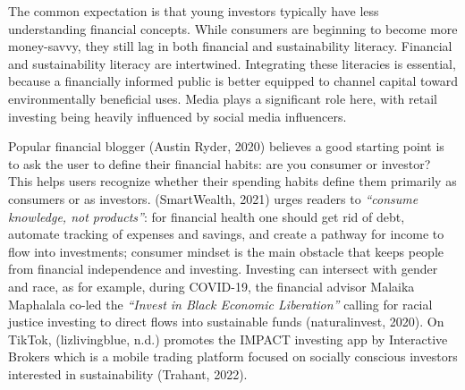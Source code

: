 \documentclass[
  12pt,
  letterpaper,
  DIV=11,
  numbers=noendperiod]{scrartcl}
\begin{document}
The common expectation is that young investors typically have less
understanding financial concepts. While consumers are beginning to
become more money-savvy, they still lag in both financial and
sustainability literacy. Financial and sustainability literacy are
intertwined. Integrating these literacies is essential, because a
financially informed public is better equipped to channel capital toward
environmentally beneficial uses. Media plays a significant role here,
with retail investing being heavily influenced by social media
influencers.

Popular financial blogger (Austin Ryder, 2020) believes a good starting
point is to ask the user to define their financial habits: are you
consumer or investor? This helps users recognize whether their spending
habits define them primarily as consumers or as investors. (SmartWealth,
2021) urges readers to \emph{``consume knowledge, not products''}: for
financial health one should get rid of debt, automate tracking of
expenses and savings, and create a pathway for income to flow into
investments; consumer mindset is the main obstacle that keeps people
from financial independence and investing. Investing can intersect with
gender and race, as for example, during COVID-19, the financial advisor
Malaika Maphalala co-led the \emph{``Invest in Black Economic
Liberation''} calling for racial justice investing to direct flows into
sustainable funds (naturalinvest, 2020). On TikTok, (lizlivingblue,
n.d.) promotes the IMPACT investing app by Interactive Brokers which is
a mobile trading platform focused on socially conscious investors
interested in sustainability (Trahant, 2022).

\def\pandoctableshortcapt{Comparative Data on Investing Apps}
\end{document}
